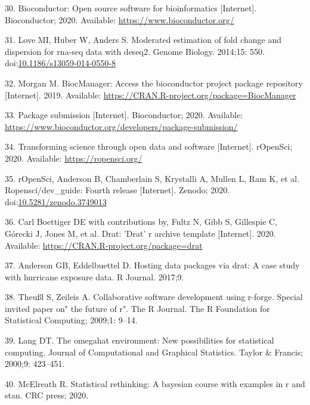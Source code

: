 \documentclass[10pt,letterpaper]{article}
\begin{document}
\leavevmode\hypertarget{ref-bioconductor}{}%
30. Bioconductor: Open source software for bioinformatics
{[}Internet{]}. Bioconductor; 2020. Available:
\url{https://www.bioconductor.org/}

\leavevmode\hypertarget{ref-DESeq2}{}%
31. Love MI, Huber W, Anders S. Moderated estimation of fold change and
dispersion for rna-seq data with deseq2. Genome Biology. 2014;15: 550.
doi:\href{https://doi.org/10.1186/s13059-014-0550-8}{10.1186/s13059-014-0550-8}

\leavevmode\hypertarget{ref-BiocManager}{}%
32. Morgan M. BiocManager: Access the bioconductor project package
repository {[}Internet{]}. 2019. Available:
\url{https://CRAN.R-project.org/package=BiocManager}

\leavevmode\hypertarget{ref-biocpkgsub2020}{}%
33. Package submission {[}Internet{]}. Bioconductor; 2020. Available:
\url{https://www.bioconductor.org/developers/package-submission/}

\leavevmode\hypertarget{ref-ropensci2020}{}%
34. Transforming science through open data and software {[}Internet{]}.
rOpenSci; 2020. Available: \url{https://ropensci.org/}

\leavevmode\hypertarget{ref-ropenscidev2020}{}%
35. rOpenSci, Anderson B, Chamberlain S, Krystalli A, Mullen L, Ram K,
et al. Ropensci/dev\_guide: Fourth release {[}Internet{]}. Zenodo; 2020.
doi:\href{https://doi.org/10.5281/zenodo.3749013}{10.5281/zenodo.3749013}

\leavevmode\hypertarget{ref-drat}{}%
36. Carl Boettiger DE with contributions by, Fultz N, Gibb S, Gillespie
C, Górecki J, Jones M, et al. Drat: 'Drat' r archive template
{[}Internet{]}. 2020. Available:
\url{https://CRAN.R-project.org/package=drat}

\leavevmode\hypertarget{ref-anderson2017}{}%
37. Anderson GB, Eddelbuettel D. Hosting data packages via drat: A case
study with hurricane exposure data. R Journal. 2017;9.

\leavevmode\hypertarget{ref-theussl2009}{}%
38. Theußl S, Zeileis A. Collaborative software development using
r-forge. Special invited paper on" the future of r". The R Journal. The
R Foundation for Statistical Computing; 2009;1: 9--14.

\leavevmode\hypertarget{ref-lang2000}{}%
39. Lang DT. The omegahat environment: New possibilities for statistical
computing. Journal of Computational and Graphical Statistics. Taylor \&
Francis; 2000;9: 423--451.

\leavevmode\hypertarget{ref-mcelreath2020}{}%
40. McElreath R. Statistical rethinking: A bayesian course with examples
in r and stan. CRC press; 2020.
\end{document}
